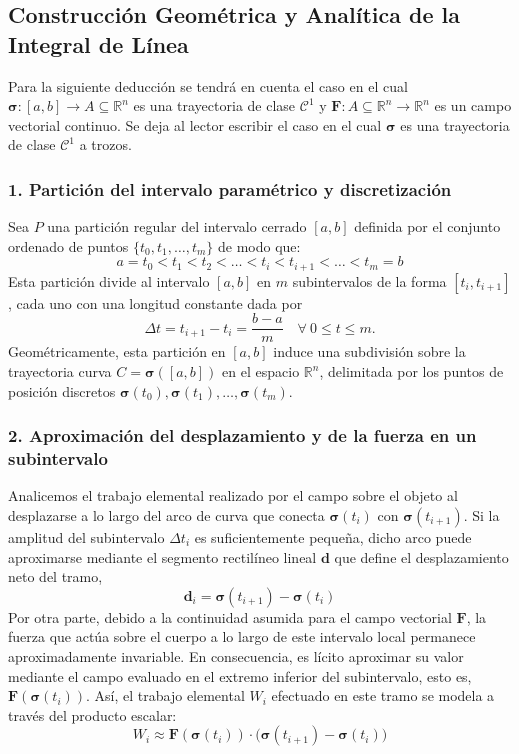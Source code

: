 \subsection*{Construcción Geométrica y Analítica de la Integral de Línea}

Para la siguiente deducci\'on se tendrá en cuenta el caso en el cual $\boldsymbol{\sigma} : [a, b] \to A \subseteq \mathbb{R}^n$ es una trayectoria de clase $\mathcal{C}^1$ y  $\mathbf{F} : A \subseteq \mathbb{R}^n \to \mathbb{R}^n$  es un campo vectorial continuo. Se deja al lector escribir el caso en el cual $\boldsymbol{\sigma}$ es una trayectoria de clase $\mathcal{C}^1$ a trozos. 

\subsubsection*{1. Partición del intervalo paramétrico y discretización}
Sea  $P$   una partición regular del intervalo cerrado $[a, b]$ definida por el conjunto ordenado de puntos $\{t_0, t_1, \dots, t_m\}$ de modo que:
\[
a = t_0 < t_1 < t_2 < \dots < t_i < t_{i+1} < \dots < t_m = b
\]
Esta partición divide al intervalo $ [a, b]$ en $m$ subintervalos de la forma $[t_i, t_{i+1}]$, cada uno con una longitud constante dada por \[\Delta t = t_{i+1} - t_i=\dfrac{b-a}{m} \quad \forall \:  0 \leq  t \leq m.\] Geométricamente, esta partición en  $[a, b]$  induce una subdivisión sobre la trayectoria curva $C =\boldsymbol{\sigma}([a,b])$ en el espacio $\mathbb{R}^n$, delimitada por los puntos de posición discretos $\boldsymbol{\sigma}(t_0), \boldsymbol{\sigma}(t_1), \dots, \boldsymbol{\sigma}(t_m)$.


\subsubsection*{2. Aproximación del desplazamiento y de la fuerza en un subintervalo}
Analicemos el trabajo elemental realizado por el campo sobre el objeto al desplazarse a lo largo del arco de curva que conecta $\boldsymbol{\sigma}(t_i)$ con $\boldsymbol{\sigma}(t_{i+1})$. Si la amplitud del subintervalo $\Delta t_i$ es suficientemente pequeña, dicho arco puede aproximarse mediante el segmento rectilíneo lineal $\mathbf{d}$  que define el desplazamiento neto del tramo, 
\[
\mathbf{d}_i  = \boldsymbol{\sigma}(t_{i+1}) - \boldsymbol{\sigma}(t_i)
\]
Por otra parte, debido a la continuidad asumida para el campo vectorial $\mathbf{F}$, la fuerza que actúa sobre el cuerpo a lo largo de este intervalo local permanece aproximadamente invariable. En consecuencia, es lícito aproximar su valor mediante el campo evaluado en el extremo inferior del subintervalo, esto es, $\mathbf{F}(\boldsymbol{\sigma}(t_i))$. Así, el trabajo elemental $W_i$ efectuado en este tramo se modela a través del producto escalar:
\[
W_i \approx \mathbf{F}(\boldsymbol{\sigma}(t_i)) \cdot \big(  \boldsymbol{\sigma}(t_{i+1}) -  \boldsymbol{\sigma}(t_i) \big)
\]


